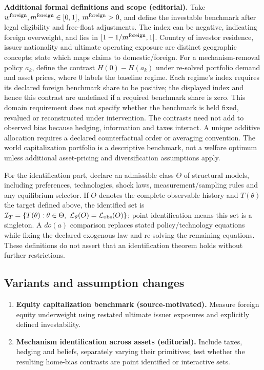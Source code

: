 \documentclass[11pt,a4paper]{article}
\begin{document}
\textbf{Additional formal definitions and scope (editorial).} Take \(w^{\rm foreign},m^{\rm foreign}\in[0,1]\), \(m^{\rm foreign}>0\), and define the investable benchmark after legal eligibility and free-float adjustments. The index can be negative, indicating foreign overweight, and lies in \([1-1/m^{\rm foreign},1]\). Country of investor residence, issuer nationality and ultimate operating exposure are distinct geographic concepts; state which maps claims to domestic/foreign. For a mechanism-removal policy \(a_k\), define the contrast \(H(0)-H(a_k)\) under re-solved portfolio demand and asset prices, where \(0\) labels the baseline regime. Each regime's index requires its declared foreign benchmark share to be positive; the displayed index and hence this contrast are undefined if a required benchmark share is zero. This domain requirement does not specify whether the benchmark is held fixed, revalued or reconstructed under intervention. The contrasts need not add to observed bias because hedging, information and taxes interact. A unique additive allocation requires a declared counterfactual order or averaging convention. The world capitalization portfolio is a descriptive benchmark, not a welfare optimum unless additional asset-pricing and diversification assumptions apply.

For the identification part, declare an admissible class \(\Theta\) of structural models, including preferences, technologies, shock laws, measurement/sampling rules and any equilibrium selector. If \(O\) denotes the complete observable history and \(T(\theta)\) the target defined above, the identified set is \(\mathcal I_T=\{T(\theta):\theta\in\Theta,\ \mathcal L_\theta(O)=\mathcal L_{\rm obs}(O)\}\); point identification means this set is a singleton. A \(do(a)\) comparison replaces stated policy/technology equations while fixing the declared exogenous law and re-solving the remaining equations. These definitions do not assert that an identification theorem holds without further restrictions.
\subsection*{Variants and assumption changes}
\begin{enumerate}
\item \textbf{Equity capitalization benchmark (source-motivated).} Measure foreign equity underweight using restated ultimate issuer exposures and explicitly defined investability.
\item \textbf{Mechanism identification across assets (editorial).} Include taxes, hedging and beliefs, separately varying their primitives; test whether the resulting home-bias contrasts are point identified or interactive sets.
\end{enumerate}
\end{document}
